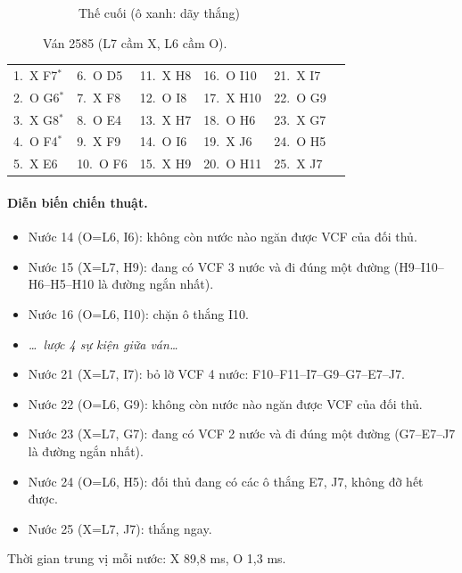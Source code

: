 \begin{figure}[H]
\begin{subfigure}[t]{.48\linewidth}
    \caption{Thế cuối (ô xanh: dãy thắng)}
  \end{subfigure}
  \caption{Ván 2585 (L7 cầm X, L6 cầm O).}
  \label{fig:cs-van-26}
\end{figure}
{\footnotesize\linespread{1}\selectfont
\noindent\begin{tabularx}{\linewidth}{*{6}{X}}
\toprule
1.~X F7$^\ast$ & 6.~O D5 & 11.~X H8 & 16.~O I10 & 21.~X I7 &  \\
2.~O G6$^\ast$ & 7.~X F8 & 12.~O I8 & 17.~X H10 & 22.~O G9 &  \\
3.~X G8$^\ast$ & 8.~O E4 & 13.~X H7 & 18.~O H6 & 23.~X G7 &  \\
4.~O F4$^\ast$ & 9.~X F9 & 14.~O I6 & 19.~X J6 & 24.~O H5 &  \\
5.~X E6 & 10.~O F6 & 15.~X H9 & 20.~O H11 & 25.~X J7 &  \\
\bottomrule
\end{tabularx}\par}
\paragraph{Diễn biến chiến thuật.}
\begin{itemize}\footnotesize\linespread{1.1}\selectfont
\setlength{\itemsep}{0pt}
  \item Nước 14 (O=L6, I6): không còn nước nào ngăn được VCF của đối thủ.
  \item Nước 15 (X=L7, H9): đang có VCF 3 nước và đi đúng một đường (H9--I10--H6--H5--H10 là đường ngắn nhất).
  \item Nước 16 (O=L6, I10): chặn ô thắng I10.
  \item[] \emph{\dots\ lược 4 sự kiện giữa ván\dots}
  \item Nước 21 (X=L7, I7): bỏ lỡ VCF 4 nước: F10--F11--I7--G9--G7--E7--J7.
  \item Nước 22 (O=L6, G9): không còn nước nào ngăn được VCF của đối thủ.
  \item Nước 23 (X=L7, G7): đang có VCF 2 nước và đi đúng một đường (G7--E7--J7 là đường ngắn nhất).
  \item Nước 24 (O=L6, H5): đối thủ đang có các ô thắng E7, J7, không đỡ hết được.
  \item Nước 25 (X=L7, J7): thắng ngay.
\end{itemize}
Thời gian trung vị mỗi nước: X 89,8 ms, O 1,3 ms.
\clearpage

